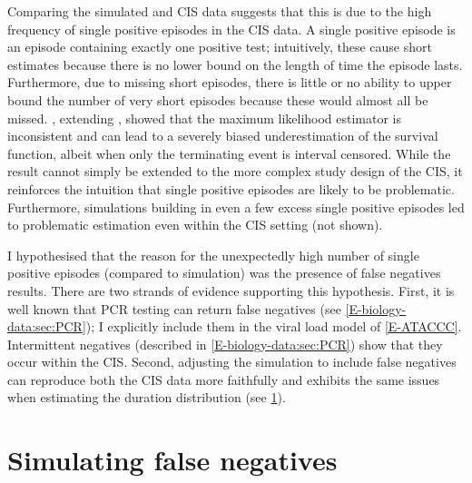 \documentclass[thesis.tex]{subfiles}
\begin{document}
Comparing the simulated and CIS data suggests that this is due to the high frequency of single positive episodes in the CIS data.
A single positive episode is an episode containing exactly one positive test; intuitively, these cause short estimates because there is no lower bound on the length of time the episode lasts.
Furthermore, due to missing short episodes, there is little or no ability to upper bound the number of very short episodes because these would almost all be missed.
\Textcite{shenNonparametrica}, extending \textcite{panNote}, showed that the maximum likelihood estimator is inconsistent and can lead to a severely biased underestimation of the survival function, albeit when only the terminating event is interval censored.
While the result cannot simply be extended to the more complex study design of the CIS, it reinforces the intuition that single positive episodes are likely to be problematic.
Furthermore, simulations building in even a few excess single positive episodes led to problematic estimation even within the CIS setting (not shown).

I hypothesised that the reason for the unexpectedly high number of single positive episodes (compared to simulation) was the presence of false negatives results.
There are two strands of evidence supporting this hypothesis.
First, it is well known that PCR testing can return false negatives  (see \cref{E-biology-data:sec:PCR}); I explicitly include them in the viral load model of \cref{E-ATACCC}.
Intermittent negatives (described in  \cref{E-biology-data:sec:PCR}) show that they occur within the CIS.
Second, adjusting the simulation to include false negatives can reproduce both the CIS data more faithfully and exhibits the same issues when estimating the duration distribution (see \cref{imperf-test:sec:simulate}).

\section{Simulating false negatives} \label{imperf-test:sec:simulate}
\end{document}
